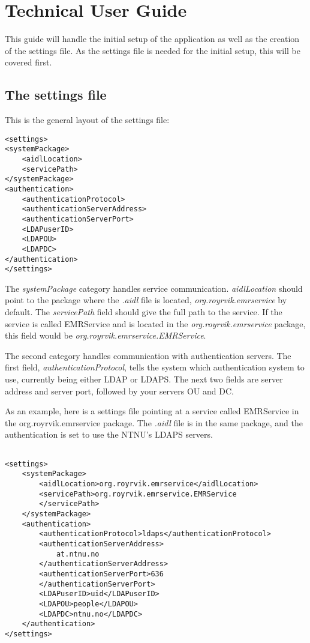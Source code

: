 \section{Technical User Guide}
\label{techmanual}

This guide will handle the initial setup of the application as well as the creation of the settings file. As the settings file is needed for the initial setup, this will be covered first.

\subsection{The settings file}
This is the general layout of the settings file:

\lstset{language=XML}
\begin{lstlisting}[caption={settings.xml}, label={lst:settingsxml}]
<settings>
<systemPackage>
    <aidlLocation>
    <servicePath>
</systemPackage>
<authentication>
    <authenticationProtocol>
    <authenticationServerAddress>
    <authenticationServerPort>
    <LDAPuserID>
    <LDAPOU>
    <LDAPDC>
</authentication>
</settings>
\end{lstlisting}

The \textit{systemPackage} category handles service communication. \textit{aidlLocation} should point to the package where the \textit{.aidl} file is located, \textit{org.royrvik.emrservice} by default. The \textit{servicePath} field should give the full path to the service. If the service is called EMRService and is located in the \textit{org.royrvik.emrservice} package, this field would be \textit{org.royrvik.emrservice.EMRService}.

The second category handles communication with authentication servers. The first field, \textit{authenticationProtocol}, tells the system which authentication system to use, currently being either LDAP or LDAPS. The next two fields are server address and server port, followed by your servers OU and DC. 

As an example, here is a settings file pointing at a service called EMRService in the org.royrvik.emrservice package. The \textit{.aidl} file is in the same package, and the authentication is set to use the NTNU's LDAPS servers.

\begin{lstlisting}[caption={An example settings file}, label={lst:examplesettings}]

<settings>
    <systemPackage>
        <aidlLocation>org.royrvik.emrservice</aidlLocation>
        <servicePath>org.royrvik.emrservice.EMRService
        </servicePath>
    </systemPackage>
    <authentication>
        <authenticationProtocol>ldaps</authenticationProtocol>
        <authenticationServerAddress>
            at.ntnu.no
        </authenticationServerAddress>
        <authenticationServerPort>636
        </authenticationServerPort>
        <LDAPuserID>uid</LDAPuserID>
        <LDAPOU>people</LDAPOU>
        <LDAPDC>ntnu.no</LDAPDC>
    </authentication>
</settings>
\end{lstlisting}
